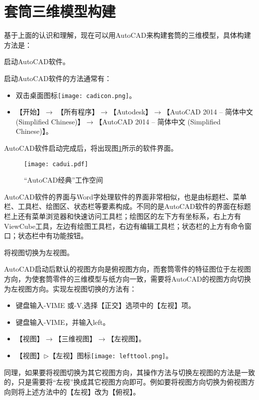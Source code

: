 \section{套筒三维模型构建}\label{sec:taotongjianmo}
基于上面的认识和理解，现在可以用AutoCAD来构建套筒的三维模型，具体构建方法是：
\begin{procedure}

\item 启动AutoCAD软件。

启动AutoCAD软件的方法通常有：
\begin{itemize}
\item 双击桌面图标\texttt{[image: cadicon.png]}。
\item 【开始】$\rightarrow$ 【所有程序】$\rightarrow$【Autodesk】$\rightarrow$【AutoCAD 2014 – 简体中文 (Simplified Chinese)】$\rightarrow$【AutoCAD 2014 – 简体中文 (Simplified Chinese)】。
\end{itemize}
AutoCAD软件启动完成后，将出现图\ref{fig:cadui}所示的软件界面。
\begin{figure}[htbp]
\centering
\texttt{[image: cadui.pdf]}
\caption{“AutoCAD经典”工作空间}\label{fig:cadui}
\end{figure}
AutoCAD软件的界面与Word字处理软件的界面非常相似，也是由标题栏、菜单栏、工具栏、绘图区、状态栏等要素构成。不同的是AutoCAD软件的界面在标题栏上还有菜单浏览器和快速访问工具栏；绘图区的左下方有坐标系，右上方有ViewCube工具，左边有绘图工具栏，右边有编辑工具栏；状态栏的上方有命令窗口；状态栏中有功能按钮。

\item 将视图切换为左视图。

AutoCAD启动后默认的视图方向是俯视图方向，而套筒零件的特征图位于左视图方向，为使套筒零件的三维模型与纸方向一致，需要将AutoCAD的视图方向切换为左视图方向。实现左视图切换的方法有：
\begin{itemize}
\item 键盘输入-VIME 或-V,选择【正交】选项中的【左视】项。
\item 键盘输入-VIME，并输入left。
\item 【视图】$\rightarrow$【三维视图】$\rightarrow$【左视图】。
\item 【视图】$\triangleright$【左视】图标\texttt{[image: lefttool.png]}。
\end{itemize}
同理，如果要将视图切换为其它视图方向，其操作方法与切换左视图的方法是一致的，只是需要将“左视”换成其它视图方向即可。例如要将视图方向切换为俯视图方向则将上述方法中的【左视】改为【俯视】。


\end{procedure}

